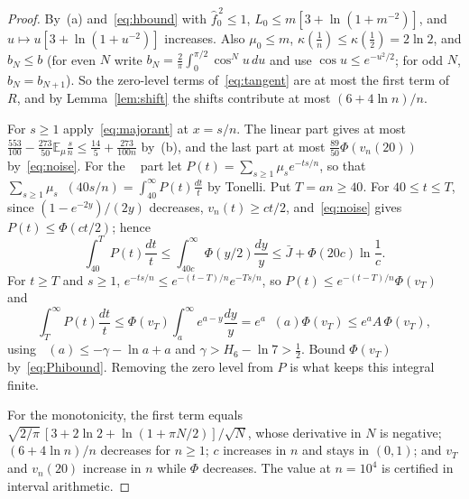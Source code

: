 \documentclass[11pt]{amsart}
\theoremstyle{definition}
\theoremstyle{remark}
\newcommand{\E}{\mathbb E}
\newcommand{\wh}[1]{\widehat{#1}}
\DeclareMathOperator{\Ei}{E_1}
\begin{document}
\begin{proof}
By~(a) and~\eqref{eq:hbound} with $\wh f_0^{\,2}\le1$, $L_0\le m[3+\ln(1+m^{-2})]$, and $u\mapsto u[3+\ln(1+u^{-2})]$ increases. Also $\mu_0\le m$, $\kappa(\frac1n)\le\kappa(\frac12)=2\ln2$, and $b_N\le b$ (for even $N$ write $b_N=\frac2\pi\int_0^{\pi/2}\cos^Nu\,du$ and use $\cos u\le e^{-u^2/2}$; for odd $N$, $b_N=b_{N+1}$). So the zero-level terms of~\eqref{eq:tangent} are at most the first term of $R$, and by Lemma~\ref{lem:shift} the shifts contribute at most $(6+4\ln n)/n$.

For $s\ge1$ apply~\eqref{eq:majorant} at $x=s/n$. The linear part gives at most $\frac{553}{100}-\frac{273}{50}\E_\mu\frac sn\le\frac{14}5+\frac{273}{100n}$ by~(b), and the last part at most $\frac{89}{50}\Phi(v_n(20))$ by~\eqref{eq:noise}. For the $\Ei$ part let $P(t)=\sum_{s\ge1}\mu_se^{-ts/n}$, so that $\sum_{s\ge1}\mu_s\Ei(40s/n)=\int_{40}^\infty P(t)\frac{dt}t$ by Tonelli. Put $T=an\ge40$. For $40\le t\le T$, since $(1-e^{-2y})/(2y)$ decreases, $v_n(t)\ge ct/2$, and~\eqref{eq:noise} gives $P(t)\le\Phi(ct/2)$; hence
\[
 \int_{40}^TP(t)\frac{dt}t\le\int_{40c}^\infty\Phi(y/2)\frac{dy}y\le\bar J+\Phi(20c)\ln\frac1c.
\]
For $t\ge T$ and $s\ge1$, $e^{-ts/n}\le e^{-(t-T)/n}e^{-Ts/n}$, so $P(t)\le e^{-(t-T)/n}\Phi(v_T)$ and
\[
 \int_T^\infty P(t)\frac{dt}t\le\Phi(v_T)\int_a^\infty e^{a-y}\frac{dy}y=e^a\Ei(a)\Phi(v_T)\le e^aA\,\Phi(v_T),
\]
using $\Ei(a)\le-\gamma-\ln a+a$ and $\gamma>H_6-\ln7>\frac12$. Bound $\Phi(v_T)$ by~\eqref{eq:Phibound}. Removing the zero level from $P$ is what keeps this integral finite.

For the monotonicity, the first term equals $\sqrt{2/\pi}\,[3+2\ln2+\ln(1+\pi N/2)]/\sqrt N$, whose derivative in $N$ is negative; $(6+4\ln n)/n$ decreases for $n\ge1$; $c$ increases in $n$ and stays in $(0,1)$; and $v_T$ and $v_n(20)$ increase in $n$ while $\Phi$ decreases. The value at $n=10^4$ is certified in interval arithmetic.
\end{proof}
\end{document}
